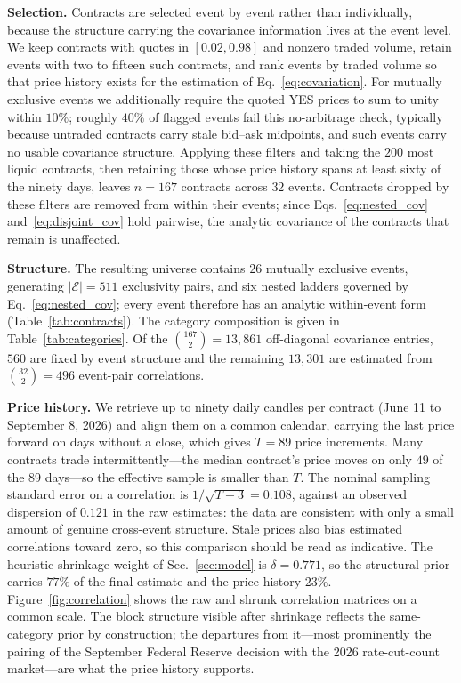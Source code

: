 \documentclass[aps, reprint, prl, twocolumn, superscriptaddress,amsmath,amssymb,noeprint]{revtex4-2}
\begin{document}
\textbf{Selection.}  Contracts are selected event by event rather than
individually, because the structure carrying the covariance information lives at
the event level.  We keep contracts with quotes in $[0.02, 0.98]$ and nonzero
traded volume, retain events with two to fifteen such contracts, and rank
events by traded volume so that price history exists for the estimation of
Eq.~\eqref{eq:covariation}.  For mutually exclusive events we additionally
require the quoted YES prices to sum to unity within $10\%$; roughly $40\%$ of
flagged events fail this no-arbitrage check, typically because untraded
contracts carry stale bid--ask midpoints, and such events carry no usable
covariance structure.  Applying these filters and taking the $200$ most liquid
contracts, then retaining those whose price history spans at least sixty of the
ninety days, leaves $n = 167$ contracts across $32$ events.  Contracts dropped
by these filters are removed from within their events; since
Eqs.~\eqref{eq:nested_cov} and~\eqref{eq:disjoint_cov} hold pairwise, the
analytic covariance of the contracts that remain is unaffected.

\textbf{Structure.}  The resulting universe contains $26$ mutually exclusive
events, generating $|\mathcal{E}| = 511$ exclusivity pairs, and six nested
ladders governed by Eq.~\eqref{eq:nested_cov}; every event therefore has an
analytic within-event form (Table~\ref{tab:contracts}).  The category
composition is given in Table~\ref{tab:categories}.  Of
the $\binom{167}{2} = 13{,}861$ off-diagonal covariance entries, $560$ are fixed
by event structure and the remaining $13{,}301$ are estimated from
$\binom{32}{2} = 496$ event-pair correlations.

\textbf{Price history.}  We retrieve up to ninety daily candles per contract
(June 11 to September 8, 2026) and align them on a common calendar, carrying the
last price forward on days without a close, which gives $T = 89$ price
increments.  Many contracts trade intermittently---the median contract's price
moves on only $49$ of the $89$ days---so the effective sample is smaller than
$T$.  The nominal sampling standard error on a correlation is
$1/\sqrt{T-3} = 0.108$, against an observed dispersion of $0.121$ in
the raw estimates: the data are consistent with only a small amount of genuine
cross-event structure.  Stale prices also bias estimated correlations toward
zero, so this comparison should be read as indicative.  The heuristic
shrinkage weight of Sec.~\ref{sec:model} is $\delta = 0.771$, so the structural prior carries $77\%$ of the final estimate
and the price history $23\%$.  Figure~\ref{fig:correlation} shows the raw and
shrunk correlation matrices on a common scale.  The block structure visible
after shrinkage reflects the same-category prior by construction; the
departures from it---most prominently the pairing of the September Federal
Reserve decision with the 2026 rate-cut-count market---are what the price
history supports.
\end{document}
